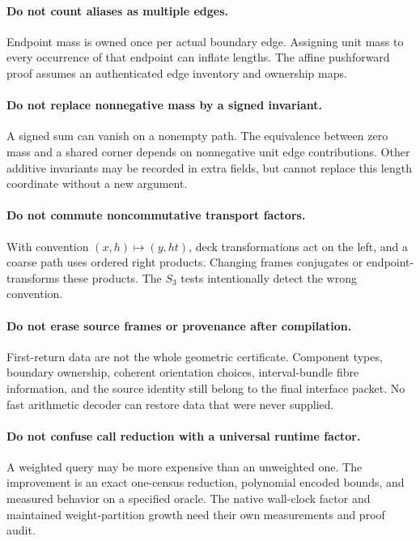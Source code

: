 \documentclass[11pt]{article}
\theoremstyle{definition}\newtheorem{definition}[theorem]{Definition}\newtheorem{example}[theorem]{Example}
\theoremstyle{remark}\newtheorem{remark}[theorem]{Remark}
\begin{document}
\paragraph{Do not count aliases as multiple edges.}
Endpoint mass is owned once per actual boundary edge. Assigning unit mass to every occurrence of that endpoint can inflate lengths. The affine pushforward proof assumes an authenticated edge inventory and ownership maps.

\paragraph{Do not replace nonnegative mass by a signed invariant.}
A signed sum can vanish on a nonempty path. The equivalence between zero mass and a shared corner depends on nonnegative unit edge contributions. Other additive invariants may be recorded in extra fields, but cannot replace this length coordinate without a new argument.

\paragraph{Do not commute noncommutative transport factors.}
With convention $(x,h)\mapsto(y,ht)$, deck transformations act on the left, and a coarse path uses ordered right products. Changing frames conjugates or endpoint-transforms these products. The $S_3$ tests intentionally detect the wrong convention.

\paragraph{Do not erase source frames or provenance after compilation.}
First-return data are not the whole geometric certificate. Component types, boundary ownership, coherent orientation choices, interval-bundle fibre information, and the source identity still belong to the final interface packet. No fast arithmetic decoder can restore data that were never supplied.

\paragraph{Do not confuse call reduction with a universal runtime factor.}
A weighted query may be more expensive than an unweighted one. The improvement is an exact one-census reduction, polynomial encoded bounds, and measured behavior on a specified oracle. The native wall-clock factor and maintained weight-partition growth need their own measurements and proof audit.
\end{document}
